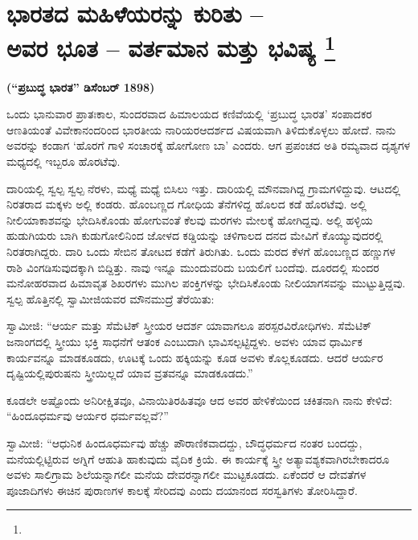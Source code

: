 
\chapter[ಭಾರತದ ಮಹಿಳೆಯರನ್ನು ಕುರಿತು – ಅವರ ಭೂತ – ವರ್ತಮಾನ ಮತ್ತು ಭವಿಷ್ಯ ]{ಭಾರತದ ಮಹಿಳೆಯರನ್ನು ಕುರಿತು –\\ ಅವರ ಭೂತ – ವರ್ತಮಾನ ಮತ್ತು ಭವಿಷ್ಯ \protect\footnote{}}

\centerline{\textbf{(“ಪ್ರಬುದ್ಧ ಭಾರತ” ಡಿಸೆಂಬರ್​ 1898)}}

\vskip 3pt

ಒಂದು ಭಾನುವಾರ ಪ್ರಾತಃಕಾಲ, ಸುಂದರವಾದ ಹಿಮಾಲಯದ ಕಣಿವೆಯಲ್ಲಿ ‘ಪ್ರಬುದ್ಧ ಭಾರತ’ ಸಂಪಾದಕರ ಆಣತಿಯಂತೆ ವಿವೇಕಾನಂದರಿಂದ ಭಾರತೀಯ ನಾರಿಯರ\break ಆದರ್ಶದ ವಿಷಯವಾಗಿ ತಿಳಿದುಕೊಳ್ಳಲು ಹೋದೆ. ನಾನು ಅವರನ್ನು ಕಂಡಾಗ ‘ಹೊರಗೆ ಗಾಳಿ ಸಂಚಾರಕ್ಕೆ ಹೋಗೋಣ ಬಾ’ ಎಂದರು. ಆಗ ಪ್ರಪಂಚದ ಅತಿ ರಮ್ಯವಾದ ದೃಶ್ಯಗಳ ಮಧ್ಯದಲ್ಲಿ ಇಬ್ಬರೂ ಹೊರಟೆವು.

\vskip 3pt

ದಾರಿಯಲ್ಲಿ ಸ್ವಲ್ಪ ಸ್ವಲ್ಪ ನೆರಳು, ಮಧ್ಯೆ ಮಧ್ಯೆ ಬಿಸಿಲು ಇತ್ತು. ದಾರಿಯಲ್ಲಿ ಮೌನವಾಗಿದ್ದ ಗ್ರಾಮಗಳಿದ್ದುವು. ಆಟದಲ್ಲಿ ನಿರತರಾದ ಮಕ್ಕಳು ಅಲ್ಲಿ ಕಂಡರು. ಹೊಂಬಣ್ಣದ ಗೋಧಿಯ ತೆನೆಗಳಿದ್ದ ಹೊಲದ ಕಡೆ ಹೊರಟೆವು. ಅಲ್ಲಿ ನೀಲಿಯಾಕಾಶವನ್ನು ಭೇದಿಸಿಕೊಂಡು ಹೋಗುವಂತೆ ಕೆಲವು ಮರಗಳು ಮೇಲಕ್ಕೆ ಹೋಗಿದ್ದವು. ಅಲ್ಲಿ ಹಳ್ಳಿಯ ಹುಡುಗಿಯರು ಬಾಗಿ ಕುಡುಗೋಲಿನಿಂದ ಜೋಳದ ಕಡ್ಡಿಯನ್ನು ಚಳಿಗಾಲದ ದನದ ಮೇವಿಗೆ ಕೊಯ್ಯುವುದರಲ್ಲಿ ನಿರತರಾಗಿದ್ದರು. ದಾರಿ ಒಂದು ಸೇಬಿನ ತೋಟದ ಕಡೆಗೆ ತಿರುಗಿತು. ಒಂದು ಮರದ ಕೆಳಗೆ ಹೊಂಬಣ್ಣದ ಹಣ್ಣುಗಳ ರಾಶಿ ವಿಂಗಡಿಸುವುದಕ್ಕಾಗಿ ಬಿದ್ದಿತ್ತು. ನಾವು ಇನ್ನೂ ಮುಂದುವರಿದು ಬಯಲಿಗೆ ಬಂದೆವು. ದೂರದಲ್ಲಿ ಸುಂದರ ಮನೋಹರವಾದ ಹಿಮಾವೃತ ಶಿಖರಗಳು ಮುಗಿಲ ಪಂಕ್ತಿಗಳನ್ನು ಭೇದಿಸಿಕೊಂಡು ನೀಲಿಯಾಗಸವನ್ನು ಮುಟ್ಟುತ್ತಿದ್ದವು. ಸ್ವಲ್ಪ ಹೊತ್ತಿನಲ್ಲಿ ಸ್ವಾಮೀಜಿಯವರ ಮೌನಮುದ್ರೆ ತೆರೆಯಿತು:

\vskip 3pt

ಸ್ವಾಮೀಜಿ: “ಆರ್ಯ ಮತ್ತು ಸೆಮೆಟಿಕ್​ ಸ್ತ್ರೀಯರ ಆದರ್ಶ ಯಾವಾಗಲೂ ಪರಸ್ಪರ\break ವಿರೋಧಿಗಳು. ಸೆಮೆಟಿಕ್​ ಜನಾಂಗದಲ್ಲಿ ಸ್ತ್ರೀಯು ಭಕ್ತಿ ಸಾಧನೆಗೆ ಆತಂಕ ಎಂಬುದಾಗಿ ಭಾವಿಸಲ್ಪಟ್ಟಿದ್ದಳು. ಅವಳು ಯಾವ ಧಾರ್ಮಿಕ ಕಾರ್ಯವನ್ನೂ ಮಾಡಕೂಡದು, ಊಟಕ್ಕೆ ಒಂದು ಹಕ್ಕಿಯನ್ನು ಕೂಡ ಅವಳು ಕೊಲ್ಲಕೂಡದು. ಆದರೆ ಆರ್ಯರ ದೃಷ್ಟಿಯಲ್ಲಿ\break ಪುರುಷನು ಸ್ತ್ರೀಯಿಲ್ಲದೆ ಯಾವ ವ್ರತವನ್ನೂ ಮಾಡಕೂಡದು.”

\vskip 3pt

ಕೂಡಲೇ ಅಷ್ಟೊಂದು ಅನಿರೀಕ್ಷಿತವೂ, ವಿನಾಯಿತಿರಹಿತವೂ ಆದ ಅವರ ಹೇಳಿಕೆಯಿಂದ ಚಕಿತನಾಗಿ ನಾನು ಕೇಳಿದೆ: “ಹಿಂದೂಧರ್ಮವು ಆರ್ಯರ ಧರ್ಮವಲ್ಲವೆ?”

\vskip 3pt

ಸ್ವಾಮೀಜಿ: “ಆಧುನಿಕ ಹಿಂದೂಧರ್ಮವು ಹೆಚ್ಚು ಪೌರಾಣಿಕವಾದದ್ದು, ಬೌದ್ಧಧರ್ಮದ ನಂತರ ಬಂದದ್ದು, ಮನೆಯಲ್ಲಿಟ್ಟಿರುವ ಅಗ್ನಿಗೆ ಆಹುತಿ ಹಾಕುವುದು ವೈದಿಕ ಕ್ರಿಯೆ. ಈ ಕಾರ್ಯಕ್ಕೆ ಸ್ತ್ರೀ ಅತ್ಯಾವಶ್ಯಕವಾಗಿರಬೇಕಾದರೂ ಅವಳು ಸಾಲಿಗ್ರಾಮ ಶಿಲೆಯನ್ನಾಗಲೀ ಮನೆಯ ದೇವರನ್ನಾಗಲೀ ಮುಟ್ಟಕೂಡದು. ಏಕೆಂದರೆ ಆ ದೇವತೆಗಳ ಪೂಜಾದಿಗಳು ಈಚಿನ ಪುರಾಣಗಳ ಕಾಲಕ್ಕೆ ಸೇರಿದವು ಎಂದು ದಯಾನಂದ ಸರಸ್ವತಿಗಳು ತೋರಿಸಿದ್ದಾರೆ.

